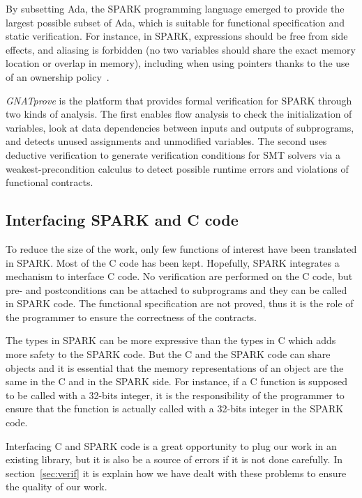 \documentclass[conference]{IEEEtran}
\begin{document}
By subsetting Ada, the SPARK programming language \cite{mccormick_chapin_2015} emerged to provide the largest possible subset of Ada, which is suitable for functional specification and static verification. For instance, in SPARK, expressions should be free from side effects, and aliasing is forbidden (no two variables should share the exact memory location or overlap in memory), including when using pointers thanks to the use of an ownership policy~\cite{dross2020recursive}. 

\emph{GNATprove} \cite{GNATProve:users_manual} is the platform that provides formal verification for SPARK through two kinds of analysis. The first enables flow analysis to check the initialization of variables, look at data dependencies between inputs and outputs of subprograms, and detects unused assignments and unmodified variables. The second uses deductive verification to generate verification conditions for SMT solvers via a weakest-precondition calculus to detect possible runtime errors and violations of functional contracts.

\subsection{Interfacing SPARK and C code}

To reduce the size of the work, only few functions of interest have been
translated in SPARK. Most of the C code has been kept.
Hopefully, SPARK integrates a mechanism to interface C code. No verification are
performed on the C code, but pre- and postconditions can be attached to
subprograms and they can be called in SPARK code.
The functional specification are not proved, thus it is the role of the
programmer to ensure the correctness of the contracts.

The types in SPARK can be more expressive than the types in C which adds more
safety to the SPARK code.
But the C and the SPARK code can share objects and it is essential that the
memory representations of an object are the same in the C and in the SPARK side.
For instance, if a C function is supposed to be called with a 32-bits integer,
it is the responsibility of the programmer to ensure that the function is
actually called with a 32-bits integer in the SPARK code.

Interfacing C and SPARK code is a great opportunity to plug our work in an
existing library, but it is also be a source of errors if it is not done
carefully. In section~\ref{sec:verif} it is explain how we have dealt with these
problems to ensure the quality of our work.
\end{document}
